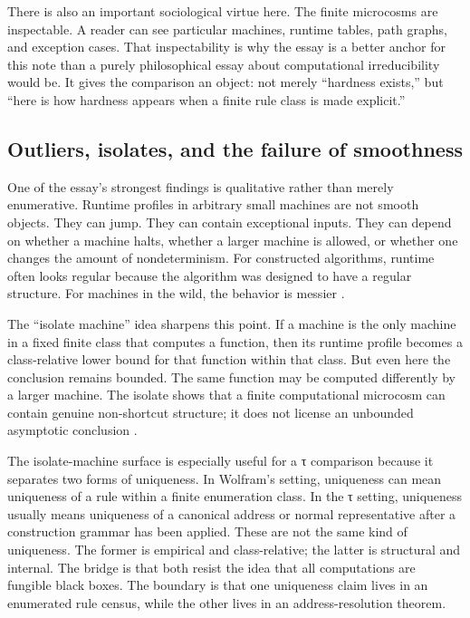 \documentclass{pantarhei-researchnote}
\begin{document}
There is also an important sociological virtue here. The finite
microcosms are inspectable. A reader can see particular machines, runtime
tables, path graphs, and exception cases. That inspectability is why the
essay is a better anchor for this note than a purely philosophical essay
about computational irreducibility would be. It gives the comparison an
object: not merely ``hardness exists,'' but ``here is how hardness appears
when a finite rule class is made explicit.''

\subsection{Outliers, isolates, and the failure of smoothness}

One of the essay's strongest findings is qualitative rather than merely
enumerative. Runtime profiles in arbitrary small machines are not smooth
objects. They can jump. They can contain exceptional inputs. They can
depend on whether a machine halts, whether a larger machine is allowed, or
whether one changes the amount of nondeterminism. For constructed
algorithms, runtime often looks regular because the algorithm was designed
to have a regular structure. For machines in the wild, the behavior is
messier \cite{Wolfram2026RuliologicalPNP}.

The ``isolate machine'' idea sharpens this point. If a machine is the only
machine in a fixed finite class that computes a function, then its runtime
profile becomes a class-relative lower bound for that function within that
class. But even here the conclusion remains bounded. The same function may
be computed differently by a larger machine. The isolate shows that a
finite computational microcosm can contain genuine non-shortcut structure;
it does not license an unbounded asymptotic conclusion
\cite{Wolfram2026RuliologicalPNP}.

The isolate-machine surface is especially useful for a τ comparison
because it separates two forms of uniqueness. In Wolfram's setting,
uniqueness can mean uniqueness of a rule within a finite enumeration
class. In the τ setting, uniqueness usually means uniqueness of a
canonical address or normal representative after a construction grammar
has been applied. These are not the same kind of uniqueness. The former
is empirical and class-relative; the latter is structural and internal.
The bridge is that both resist the idea that all computations are
fungible black boxes. The boundary is that one uniqueness claim lives in
an enumerated rule census, while the other lives in an address-resolution
theorem.
\end{document}
